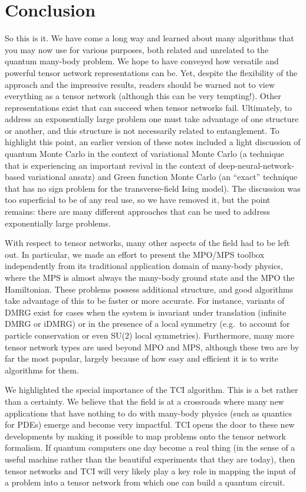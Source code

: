 \documentclass{SciPost}
\begin{document}
\section{Conclusion}
\label{sec:conclusion}

So this is it. We have come a long way and learned about many algorithms that you may now use for various purposes, both related and unrelated to the quantum many-body problem. 
We hope to have conveyed how versatile and powerful tensor network representations can be. Yet, despite the flexibility of the approach and the impressive results, readers should be warned not to view everything as a tensor network (although this can be very tempting!). Other representations exist that can succeed when tensor networks fail. Ultimately, to address an exponentially large problem one must take advantage of one structure or another, and this structure is not necessarily related to entanglement.
To highlight this point, an earlier version of these notes included a light discussion of quantum Monte Carlo in the context of variational Monte Carlo (a technique that is experiencing an important revival in the context of deep-neural-network-based variational ansatz) and Green function Monte Carlo (an ``exact'' technique that has no sign problem for the transverse-field Ising model). The discussion was too superficial to be of any real use, so we have removed it, but the point remains: there are many different approaches that can be used to address exponentially large problems.

With respect to tensor networks, many other aspects of the field had to be left out. In particular, we made an effort to present the MPO/MPS toolbox independently from its traditional application domain of many-body physics, where the MPS is almost always the many-body ground state and the MPO the Hamiltonian. These problems possess additional structure, and good algorithms take advantage of this to be faster or more accurate. For instance, variants of DMRG exist for cases when the system is invariant under translation (infinite DMRG or iDMRG) or in the presence of a local symmetry (e.g.\ to account for particle conservation or even SU(2) local symmetries).
Furthermore, many more tensor network types are used beyond MPO and MPS, although these two are by far the most popular, largely because of how easy and efficient it is to write algorithms for them.

We highlighted the special importance of the TCI algorithm. This is a bet rather than a certainty. We believe that the field is at a crossroads where many new applications that have nothing to do with many-body physics (such as quantics for PDEs) emerge and become very impactful. TCI opens the door to these new developments by making it possible to map problems onto the tensor network formalism. If quantum computers one day become a real thing (in the sense of a useful machine rather than the beautiful experiments that they are today), then tensor networks and TCI will very likely play a key role in mapping the input of a problem into a tensor network from which one can build a quantum circuit.
\end{document}
